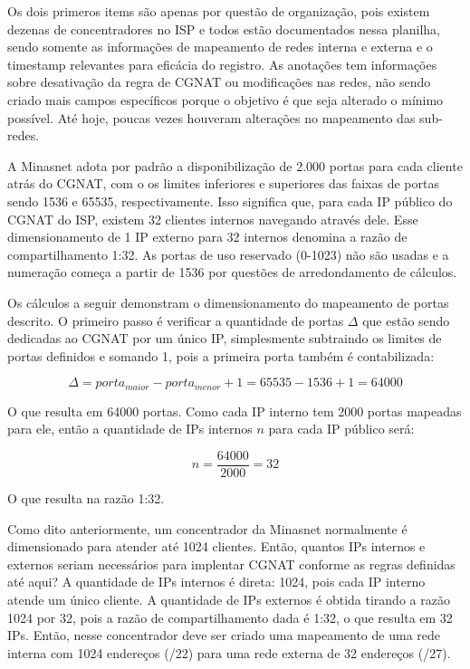    Os dois primeros items são apenas por questão de organização, pois existem dezenas de concentradores no ISP e todos estão documentados nessa planilha, sendo somente as informações de mapeamento de redes interna e externa e o timestamp relevantes para eficácia do registro. As anotações tem informações sobre desativação da regra de CGNAT ou modificações nas redes, não sendo criado mais campos específicos porque o objetivo é que seja alterado o mínimo possível. Até hoje, poucas vezes houveram alterações no mapeamento das sub-redes. 

    A Minasnet adota por padrão a disponibilização de 2.000 portas para cada cliente atrás do CGNAT, com o os limites inferiores e superiores das faixas de portas sendo 1536 e 65535, respectivamente. Isso significa que, para cada IP público do CGNAT do ISP, existem 32 clientes internos navegando através dele. Esse dimensionamento de 1 IP externo para 32 internos denomina a razão de compartilhamento 1:32. As portas de uso reservado (0-1023) não são usadas e a numeração começa a partir de 1536 por questões de arredondamento de cálculos.
    
    Os cálculos a seguir demonstram o dimensionamento do mapeamento de portas descrito. O primeiro passo é verificar a quantidade de portas $ \Delta $ que estão sendo dedicadas ao CGNAT por um único IP, simplesmente subtraindo os limites de portas definidos e somando 1, pois a primeira porta também é contabilizada:

    \begin{equation}
        \Delta = porta_{maior} - porta_{menor} + 1
               = 65535 - 1536 + 1
               = 64000
    \end{equation}
    
    O que resulta em 64000 portas. Como cada IP interno tem 2000 portas mapeadas para ele, então a quantidade de IPs internos $ n $ para cada IP público será:

    \begin{equation}
        n = \frac{64000}{2000}
          = 32
    \end{equation}

    O que resulta na razão 1:32.

    Como dito anteriormente, um concentrador da Minasnet normalmente é dimensionado para atender até 1024 clientes. Então, quantos IPs internos e externos seriam necessários para implentar CGNAT conforme as regras definidas até aqui? A quantidade de IPs internos é direta: 1024, pois cada IP interno atende um único cliente. A quantidade de IPs externos é obtida tirando a razão 1024 por 32, pois a razão de compartilhamento dada é 1:32, o que resulta em 32 IPs. Então, nesse concentrador deve ser criado uma mapeamento de uma rede interna com 1024 endereços (/22) para uma rede externa de 32 endereços (/27).
    
